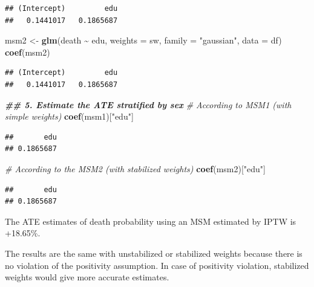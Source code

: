 \documentclass[
]{book}
\newenvironment{Shaded}{\begin{snugshade}}{\end{snugshade}}
\newcommand{\AttributeTok}[1]{\textcolor[rgb]{0.13,0.29,0.53}{#1}}
\newcommand{\CommentTok}[1]{\textcolor[rgb]{0.56,0.35,0.01}{\textit{#1}}}
\newcommand{\DocumentationTok}[1]{\textcolor[rgb]{0.56,0.35,0.01}{\textbf{\textit{#1}}}}
\newcommand{\FunctionTok}[1]{\textcolor[rgb]{0.13,0.29,0.53}{\textbf{#1}}}
\newcommand{\NormalTok}[1]{#1}
\newcommand{\OtherTok}[1]{\textcolor[rgb]{0.56,0.35,0.01}{#1}}
\newcommand{\SpecialCharTok}[1]{\textcolor[rgb]{0.81,0.36,0.00}{\textbf{#1}}}
\newcommand{\StringTok}[1]{\textcolor[rgb]{0.31,0.60,0.02}{#1}}
\begin{document}
\begin{verbatim}
## (Intercept)         edu 
##   0.1441017   0.1865687
\end{verbatim}

\begin{Shaded}
\begin{Highlighting}[]
\NormalTok{msm2 }\OtherTok{\textless{}{-}} \FunctionTok{glm}\NormalTok{(death }\SpecialCharTok{\textasciitilde{}}\NormalTok{ edu,}
            \AttributeTok{weights =}\NormalTok{ sw,}
            \AttributeTok{family =} \StringTok{"gaussian"}\NormalTok{,}
            \AttributeTok{data =}\NormalTok{ df)}
\FunctionTok{coef}\NormalTok{(msm2)}
\end{Highlighting}
\end{Shaded}

\begin{verbatim}
## (Intercept)         edu 
##   0.1441017   0.1865687
\end{verbatim}

\begin{Shaded}
\begin{Highlighting}[]
\DocumentationTok{\#\# 5. Estimate the ATE stratified by sex}
\CommentTok{\# According to MSM1 (with simple weights)}
\FunctionTok{coef}\NormalTok{(msm1)[}\StringTok{"edu"}\NormalTok{]}
\end{Highlighting}
\end{Shaded}

\begin{verbatim}
##       edu 
## 0.1865687
\end{verbatim}

\begin{Shaded}
\begin{Highlighting}[]
\CommentTok{\# According to the MSM2 (with stabilized weights)}
\FunctionTok{coef}\NormalTok{(msm2)[}\StringTok{"edu"}\NormalTok{]}
\end{Highlighting}
\end{Shaded}

\begin{verbatim}
##       edu 
## 0.1865687
\end{verbatim}

The ATE estimates of death probability using an MSM estimated by IPTW is +18.65\%.

The results are the same with unstabilized or stabilized weights because there is no violation of the positivity assumption. In case of positivity violation, stabilized weights would give more accurate estimates.
\end{document}
